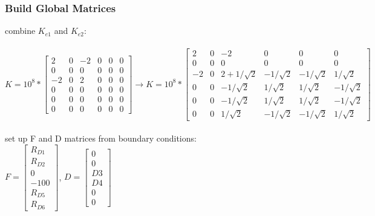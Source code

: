 \documentclass{article}
\begin{document}
\subsubsection*{Build Global Matrices}
combine $K_{e1}$ and $K_{e2}$: \\\\
$K=10^8*\begin{bmatrix}
    2 & 0 & -2 & 0 & 0 & 0 \\
    0 & 0 & 0 & 0 & 0 & 0 \\
    -2 & 0 & 2 & 0 & 0 & 0 \\
    0 & 0 & 0 & 0 & 0 & 0 \\
    0 & 0 & 0 & 0 & 0 & 0 \\
    0 & 0 & 0 & 0 & 0 & 0
\end{bmatrix}\rightarrow K=10^8*\begin{bmatrix}
    2 & 0 & -2 & 0 & 0 & 0 \\
    0 & 0 & 0 & 0 & 0 & 0 \\
    -2 & 0 & 2+1/\sqrt{2} & -1/\sqrt{2} & -1/\sqrt{2} & 1/\sqrt{2} \\
    0 & 0 & -1/\sqrt{2} & 1/\sqrt{2} & 1/\sqrt{2} & -1/\sqrt{2} \\
    0 & 0 & -1/\sqrt{2} & 1/\sqrt{2} & 1/\sqrt{2} & -1/\sqrt{2} \\
    0 & 0 & 1/\sqrt{2} & -1/\sqrt{2} & -1/\sqrt{2} & 1/\sqrt{2}
\end{bmatrix}$ \\\\
set up F and D matrices from boundary conditions: \\
$F=\begin{bmatrix}
    R_{D1} \\ R_{D2} \\ 0 \\ -100 \\ R_{D5} \\ R_{D6}
\end{bmatrix}$, \quad
$D=\begin{bmatrix}
    0 \\ 0 \\ D3 \\ D4 \\ 0 \\ 0
\end{bmatrix}$
\end{document}
